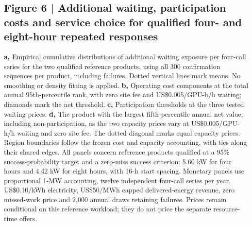 \documentclass[10pt,a4paper]{article}
\begin{document}
\begin{minipage}{\textwidth}
\subsection*{Figure 6 | Additional waiting, participation costs and service choice for qualified four- and eight-hour repeated responses}

\textbf{a,} Empirical cumulative distributions of additional waiting exposure per four-call series for the two qualified reference products, using all 300 confirmation sequences per product, including failures. Dotted vertical lines mark means. No smoothing or density fitting is applied. \textbf{b,} Operating cost components at the total annual 95th-percentile rank, with zero site fee and US\$0.005/GPU-h/h waiting; diamonds mark the net threshold. \textbf{c,} Participation thresholds at the three tested waiting prices. \textbf{d,} The product with the largest fifth-percentile annual net value, including non-participation, as the two capacity prices vary at US\$0.005/GPU-h/h waiting and zero site fee. The dotted diagonal marks equal capacity prices. Region boundaries follow the frozen cost and capacity accounting, with ties along their shared edges. All panels concern reference products qualified at a 95\% success-probability target and a zero-miss success criterion: 5.60 kW for four hours and 4.42 kW for eight hours, with 16-h start spacing. Monetary panels use proportional 1-MW accounting, twelve independent four-call series per year, US\$0.10/kWh electricity, US\$50/MWh capped delivered-energy revenue, zero missed-work price and 2,000 annual draws retaining failures. Prices remain conditional on this reference workload; they do not price the separate resource-time offers.
\end{minipage}\par\vspace{7pt}
\end{document}
